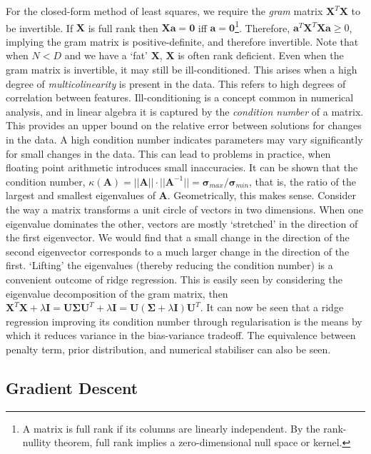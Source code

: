 \documentclass[11pt]{amsart}
\begin{document}
For the closed-form method of least squares, we require the \emph{gram} matrix $\mathbf{X}^T\mathbf{X}$ to be invertible. If $\mathbf{X}$ is full rank then $\mathbf{X}\mathbf{a} = \mathbf{0}$ iff $\mathbf{a} = \mathbf{0}$\footnote{A matrix is full rank if its columns are linearly independent. By the rank-nullity theorem, full rank implies a zero-dimensional null space or kernel.}. Therefore, $\mathbf{a}^T\mathbf{X}^T\mathbf{X}\mathbf{a} \geq 0$, implying the gram matrix is positive-definite, and therefore invertible. Note that when $N < D$ and we have a `fat' $\mathbf{X}$, $\mathbf{X}$ is often rank deficient. Even when the gram matrix is invertible, it may still be ill-conditioned. This arises when a high degree of \emph{multicolinearity} is present in the data. This refers to high degrees of correlation between features. Ill-conditioning is a concept common in numerical analysis, and in linear algebra it is captured by the \emph{condition number} of a matrix. This provides an upper bound on the relative error between solutions for changes in the data. A high condition number indicates parameters may vary significantly for small changes in the data. This can lead to problems in practice, when floating point arithmetic introduces small inaccuracies. It can be shown that the condition number, $\kappa({\mathbf{A}}) = ||\mathbf{A}||\cdot||\mathbf{A}^{-1}|| = \boldsymbol\sigma_{max}/\boldsymbol\sigma_{min}$, that is, the ratio of the largest and smallest eigenvalues of $\mathbf{A}$. Geometrically, this makes sense. Consider the way a matrix transforms a unit circle of vectors in two dimensions. When one eigenvalue dominates the other, vectors are mostly `stretched' in the direction of the first eigenvector. We would find that a small change in the direction of the second eigenvector corresponds to a much larger change in the direction of the first. `Lifting' the eigenvalues (thereby reducing the condition number) is a convenient outcome of ridge regression. This is easily seen by considering the eigenvalue decomposition of the gram matrix, then $\mathbf{X}^T\mathbf{X} + \lambda\mathbf{I} = \mathbf{U}\boldsymbol\Sigma\mathbf{U}^T + \lambda\mathbf{I} = \mathbf{U}(\boldsymbol\Sigma + \lambda\mathbf{I})\mathbf{U}^T$. It can now be seen that a ridge regression improving its condition number through regularisation is the means by which it reduces variance in the bias-variance tradeoff. The equivalence between penalty term, prior distribution, and numerical stabiliser can also be seen.

\subsection{Gradient Descent}
\end{document}
